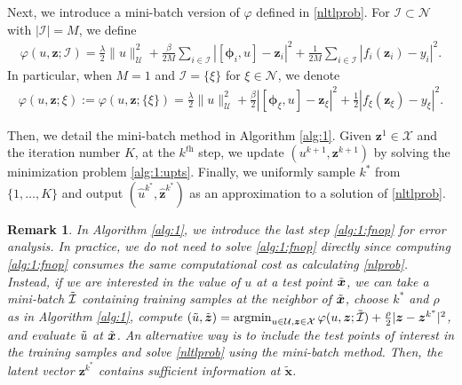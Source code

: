 \documentclass[10pt,reqno]{amsart}
\newcommand{\argmin}{\operatorname{argmin}}
\newcommand{\1}{{\chi}}
\numberwithin{equation}{section}
\theoremstyle{thmlemcorr}
\numberwithin{theorem}{section}
\theoremstyle{thmlemcorr*}
\theoremstyle{defi}
\theoremstyle{remexample}
\newtheorem{remark}[theorem]{Remark}
\theoremstyle{ass}
\begin{document}
Next, we introduce a mini-batch version of  $\varphi$ defined in \eqref{nltlprob}. For $\mathcal{I}\subset \mathcal{N}$ with $|\mathcal{I}|=M$, we define
\begin{align}
	\label{nlGPvpI}
	\varphi(u, \boldsymbol{z}; \mathcal{I})=\frac{\lambda}{2}\|u\|_{\mathcal{U}}^2 + \frac{\beta}{2 M}\sum_{i\in \mathcal{I}}|[\boldsymbol{\phi}_i, u] - \boldsymbol{z}_i|^2 + \frac{1}{2M}\sum_{i\in \mathcal{I}}|f_i(\boldsymbol{z}_i) - y_i|^2. 
\end{align}
In particular, when $M=1$ and $\mathcal{I}=\{\xi\}$ for $\xi\in \mathcal{N}$, we denote
\begin{align*}
	\varphi(u, \boldsymbol{z}; \xi):=\varphi(u, \boldsymbol{z}; \{\xi\})=\frac{\lambda}{2}\|u\|_{\mathcal{U}}^2 + \frac{\beta}{2}|[\boldsymbol{\phi}_{\xi}, u] - \boldsymbol{z}_{\xi}|^2 + \frac{1}{2}|f_{\xi}(\boldsymbol{z}_{\xi}) - y_{\xi}|^2. 
\end{align*}

Then, we detail the mini-batch method in Algorithm \ref{alg:1}. Given  $\boldsymbol{z}^1\in \mathcal{X}$ and the iteration number $K$, at the $k^{\textit{th}}$ step, we update $(u^{k+1}, \boldsymbol{z}^{k+1})$ by solving the minimization problem \eqref{alg:1:upts}.
Finally, we uniformly sample $k^*$ from $\{1, \dots, K\}$ and output $(\hat{u}^{k^*}, \hat{\boldsymbol{z}}^{k^*})$ as an approximation to a solution of \eqref{nltlprob}. 
\begin{remark}
	\label{lnfse}
	In Algorithm \ref{alg:1}, we introduce the last step \eqref{alg:1:fnop} for error analysis. 
	In practice, we do not need to solve \eqref{alg:1:fnop} directly since computing \eqref{alg:1:fnop} consumes the same computational cost as calculating \eqref{nlprob}. Instead, if we are interested in the value of $u$ at a test point $\Tilde{\boldsymbol{x}}$, we can take a mini-batch $\Tilde{\mathcal{I}}$ containing training samples at the neighbor of  $\Tilde{\boldsymbol{x}}$, choose $k^*$ and $\rho$ as in Algorithm \ref{alg:1}, compute
	$(\Tilde{u}, \Tilde{\boldsymbol{z}}) = \argmin_{u\in \mathcal{U}, \boldsymbol{z}\in \mathcal{X}} \varphi(u, \boldsymbol{z}; \Tilde{\mathcal{I}}) + \frac{\rho}{2}|\boldsymbol{z} - \boldsymbol{z}^{k^*}|^2$,
	and evaluate $\Tilde{u}$ at $\Tilde{\boldsymbol{x}}$. An alternative way is to include the test points of interest in the training samples and solve \eqref{nltlprob} using the mini-batch method. Then, the latent vector $\boldsymbol{z}^{k^*}$ contains sufficient information at $\tilde{\boldsymbol{x}}$. 
\end{remark}
\end{document}
